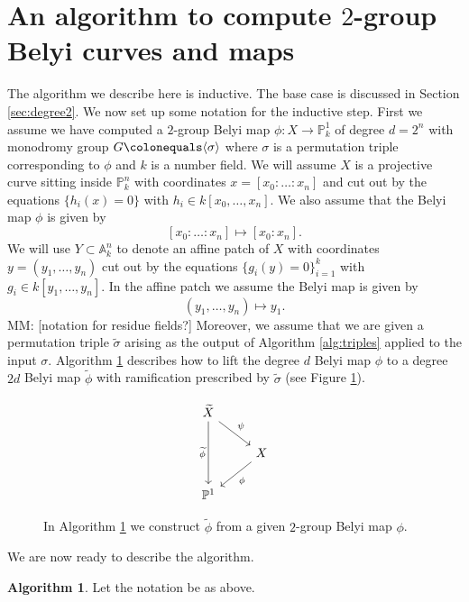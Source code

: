 \documentclass{dcthesis}
\newcommand{\PP}{\mathbb P}
\renewcommand{\AA}{\mathbb A}
\newcommand{\mm}[1]{{\color{blue} \sf MM: [#1]}}
\newcommand{\wt}[1]{\widetilde{#1}}
\theoremstyle{definition}
\newtheorem{alg}[prop]{Algorithm}
\theoremstyle{remark}
\begin{document}
{  \section{An algorithm to compute $2$-group Belyi curves and maps}{\label{sec:curvesandmaps}
    The algorithm we describe here is inductive.
    The base case is discussed in Section \ref{sec:degree2}.
    We now set up some notation for the inductive step.
    First we assume
    we have computed a $2$-group Belyi map $\phi:X\to\PP^1_k$ of degree
    $d=2^n$ with monodromy group $G\colonequals\langle\sigma\rangle$
    where $\sigma$ is a permutation triple corresponding to $\phi$
    and $k$ is a number field.
    We will assume $X$ is a projective curve sitting inside $\PP^n_k$
    with coordinates $x=[x_0:\dots:x_n]$ and
    cut out by the equations $\{h_i(x)=0\}$ with $h_i\in k[x_0,\dots,x_n]$.
    We also assume that the Belyi map $\phi$ is given by
    \[
      [x_0:\dots:x_n]\mapsto [x_0:x_n].
    \]
    We will use $Y\subset\AA^n_k$ to denote an affine patch of $X$ with coordinates
    $y=(y_1,\dots,y_n)$ cut out by the equations $\{g_i(y)=0\}_{i=1}^k$ with
    $g_i\in k[y_1,\dots,y_n]$.
    In the affine patch we assume the Belyi map is given by
    \[
      (y_1,\dots,y_n)\mapsto y_1.
    \]
    \mm{notation for residue fields?}
    Moreover, we assume
    that we are given a permutation triple $\wt{\sigma}$ arising as the output
    of Algorithm \ref{alg:triples} applied to the input $\sigma$.
    Algorithm \ref{alg:lift} describes how to lift the degree $d$ Belyi map $\phi$
    to a degree $2d$ Belyi map $\wt{\phi}$ with ramification prescribed by $\wt{\sigma}$
    (see Figure \ref{fig:lift}).
    \begin{figure}[ht]
      \label{fig:lift}
      \[
        \begin{tikzcd}[ampersand replacement=\&]
          \widetilde{X}\arrow{dd}[swap]{\widetilde{\phi}}\arrow{dr}{\psi}\\
          \&X\arrow{dl}{\phi}\\
          \PP^1
        \end{tikzcd}
      \]
      \caption{
        In Algorithm \ref{alg:lift} we construct $\wt{\phi}$
        from a given $2$-group Belyi map $\phi$.
      }
    \end{figure}
    We are now ready to describe the algorithm.
    \begin{alg}\label{alg:lift}
      Let the notation be as above.

\end{alg}}}
\end{document}

